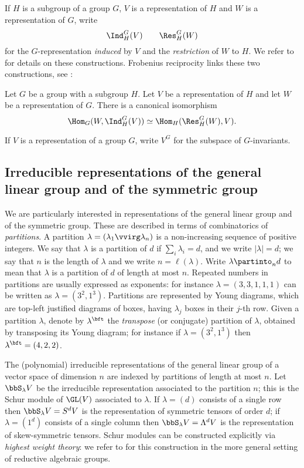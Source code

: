 If $H$ is a subgroup of a group $G$, $V$ is a representation of $H$ and $W$ is a representation of $G$, write 
\[
\Ind_H^G ( V) \qquad \Res_H^G (W)
\]
for the $G$-representation \emph{induced} by $V$ and the \emph{restriction} of $W$ to $H$. We refer to \cite[Sec. 4.4.1]{GW09} for details on these constructions. Frobenius reciprocity links these two constructions, see \cite[Thm. 4.4.1]{GW09}:
\begin{lemma}
 \label{introduction-lemma-Frobeniusreciprocity}
 Let $G$ be a group with a subgroup $H$. Let $V$ be a representation of $H$ and let $W$ be a representation of $G$. There is a canonical isomorphism
 \[
\Hom_G(W,\Ind_H^G ( V)) \simeq \Hom_H (\Res_H^G (W) , V).
 \]
\end{lemma}
If $V$ is a representation of a group $G$, write $V^G$ for the subspace of $G$-invariants. 

\subsection{Irreducible representations of the general linear group and of the symmetric group}
\label{introduction-subsection-irrepsGLandSn}

We are particularly interested in representations of the general linear group and of the symmetric group. These are described in terms of combinatorics of \emph{partitions}. A partition $\lambda = (\lambda_1 \vvirg \lambda_n)$ is a non-increasing sequence of positive integers. We say that $\lambda$ is a partition of $d$ if $\sum_i \lambda_i = d$, and we write $|\lambda| = d$; we say that $n$ is the length of $\lambda$ and we write $n = \ell(\lambda)$. Write $\lambda \partinto_n d$ to mean that $\lambda$ is a partition of $d$ of length at most $n$. Repeated numbers in partitions are usually expressed as exponents: for instance $\lambda= (3,3,1,1,1)$ can be written as $\lambda = (3^2,1^3)$. Partitions are represented by Young diagrams, which are top-left justified diagrams of boxes, having $\lambda_j$ boxes in their $j$-th row. Given a partition $\lambda$, denote by $\lambda^{\bft}$ the \emph{transpose} (or conjugate) partition of $\lambda$, obtained by transposing its Young diagram; for instance if $\lambda = (3^2,1^3)$ then $\lambda^\bft = (4,2,2)$. 

The (polynomial) irreducible representations of the general linear group of a vector space of dimension $n$ are indexed by partitions of length at most $n$. Let $\bbS_\lambda V$ be the irreducible representation associated to the partition $n$; this is the Schur module of $\GL(V)$ associated to $\lambda$. If $\lambda = (d)$ consists of a single row then $\bbS_\lambda V = S^d V$ is the representation of symmetric tensors of order $d$; if $\lambda = (1^d)$ consists of a single column then $\bbS_\lambda V = \Lambda^d V$ is the representation of skew-symmetric tensors. Schur modules can be constructed explicitly via \emph{highest weight theory}: we refer to \cite{FH91} for this construction in the more general setting of reductive algebraic groups.

